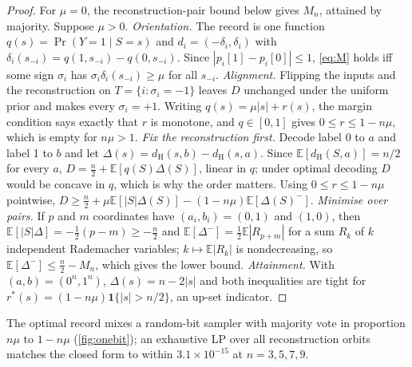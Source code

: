 \documentclass[sigconf,anonymous,acmthm=false]{aamas}
\theoremstyle{acmplain}
\theoremstyle{acmdefinition}
\newcommand{\E}{\mathbb{E}}
\newcommand{\dH}{d_{\mathrm{H}}}
\begin{document}
\begin{proof}
For $\mu=0$, the reconstruction-pair bound below gives $M_n$, attained by majority. Suppose $\mu>0$. \emph{Orientation.} The record is one function $q(s)=\Pr(Y=1\mid S=s)$ and
$d_i=(-\delta_i,\delta_i)$ with $\delta_i(s_{-i})=q(1,s_{-i})-q(0,s_{-i})$. Since
$|p_i[1]-p_i[0]|\le1$, \eqref{eq:M} holds iff some sign $\sigma_i$ has
$\sigma_i\delta_i(s_{-i})\ge\mu$ for all $s_{-i}$. \emph{Alignment.} Flipping the inputs and
the reconstruction on $T=\{i:\sigma_i=-1\}$ leaves $D$ unchanged under the uniform prior and
makes every $\sigma_i=+1$. Writing $q(s)=\mu|s|+r(s)$, the margin condition says exactly that
$r$ is monotone, and $q\in[0,1]$ gives $0\le r\le1-n\mu$, which is empty for $n\mu>1$.
\emph{Fix the reconstruction first.} Decode label 0 to $a$ and label 1 to $b$ and let
$\Delta(s)=\dH(s,b)-\dH(s,a)$. Since $\E[\dH(S,a)]=n/2$ for every $a$,
$D=\frac n2+\E[q(S)\Delta(S)]$, linear in $q$; under optimal decoding $D$ would be concave in
$q$, which is why the order matters. Using $0\le r\le1-n\mu$ pointwise,
$D\ge\frac n2+\mu\E[|S|\Delta(S)]-(1-n\mu)\E[\Delta(S)^-]$. \emph{Minimise over pairs.} If
$p$ and $m$ coordinates have $(a_i,b_i)=(0,1)$ and $(1,0)$, then
$\E[|S|\Delta]=-\frac12(p-m)\ge-\frac n2$ and $\E[\Delta^-]=\frac12\E|R_{p+m}|$ for a sum $R_k$
of $k$ independent Rademacher variables; $k\mapsto\E|R_k|$ is nondecreasing, so
$\E[\Delta^-]\le\frac n2-M_n$, which gives the lower bound. \emph{Attainment.} With
$(a,b)=(0^n,1^n)$, $\Delta(s)=n-2|s|$ and both inequalities are tight for
$r^*(s)=(1-n\mu)\mathbf1\{|s|>n/2\}$, an up-set indicator.
\end{proof}

The optimal record mixes a random-bit sampler with majority vote in proportion $n\mu$ to
$1-n\mu$ (\cref{fig:onebit}); an exhaustive LP over all reconstruction orbits matches the closed
form to within $3.1\times10^{-15}$ at $n=3,5,7,9$.
\end{document}
